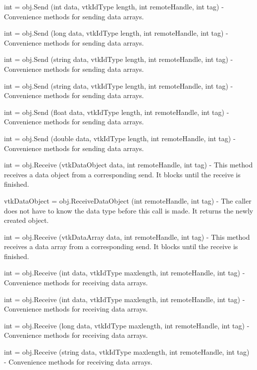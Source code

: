 \begin{DoxyItemize}
\item {\ttfamily int = obj.\-Send (int data, vtk\-Id\-Type length, int remote\-Handle, int tag)} -\/ Convenience methods for sending data arrays.  
\item {\ttfamily int = obj.\-Send (long data, vtk\-Id\-Type length, int remote\-Handle, int tag)} -\/ Convenience methods for sending data arrays.  
\item {\ttfamily int = obj.\-Send (string data, vtk\-Id\-Type length, int remote\-Handle, int tag)} -\/ Convenience methods for sending data arrays.  
\item {\ttfamily int = obj.\-Send (string data, vtk\-Id\-Type length, int remote\-Handle, int tag)} -\/ Convenience methods for sending data arrays.  
\item {\ttfamily int = obj.\-Send (float data, vtk\-Id\-Type length, int remote\-Handle, int tag)} -\/ Convenience methods for sending data arrays.  
\item {\ttfamily int = obj.\-Send (double data, vtk\-Id\-Type length, int remote\-Handle, int tag)} -\/ Convenience methods for sending data arrays.  
\item {\ttfamily int = obj.\-Receive (vtk\-Data\-Object data, int remote\-Handle, int tag)} -\/ This method receives a data object from a corresponding send. It blocks until the receive is finished.  
\item {\ttfamily vtk\-Data\-Object = obj.\-Receive\-Data\-Object (int remote\-Handle, int tag)} -\/ The caller does not have to know the data type before this call is made. It returns the newly created object.  
\item {\ttfamily int = obj.\-Receive (vtk\-Data\-Array data, int remote\-Handle, int tag)} -\/ This method receives a data array from a corresponding send. It blocks until the receive is finished.  
\item {\ttfamily int = obj.\-Receive (int data, vtk\-Id\-Type maxlength, int remote\-Handle, int tag)} -\/ Convenience methods for receiving data arrays.  
\item {\ttfamily int = obj.\-Receive (int data, vtk\-Id\-Type maxlength, int remote\-Handle, int tag)} -\/ Convenience methods for receiving data arrays.  
\item {\ttfamily int = obj.\-Receive (long data, vtk\-Id\-Type maxlength, int remote\-Handle, int tag)} -\/ Convenience methods for receiving data arrays.  
\item {\ttfamily int = obj.\-Receive (string data, vtk\-Id\-Type maxlength, int remote\-Handle, int tag)} -\/ Convenience methods for receiving data arrays.  

\end{DoxyItemize}
